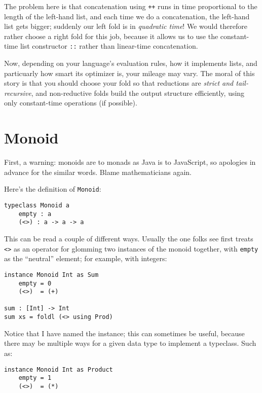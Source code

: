 \documentclass{book}
\newcommand{\mlil}[1]{\lstinline[language=pseudoml,columns=fixed]|#1|}\usepackage{caption}
\begin{document}
The problem here is that concatenation using \mlil{++} runs in time proportional to the length of the left-hand list, and each time we do a concatenation, the left-hand list gets bigger; suddenly our left fold is in \emph{quadratic time}! We would therefore rather choose a right fold for this job, because it allows us to use the constant-time list constructor \mlil{::} rather than linear-time concatenation.

Now, depending on your language's evaluation rules, how it implements lists, and particuarly how smart its optimizer is, your mileage may vary. The moral of this story is that you should choose your fold so that reductions are \emph{strict and tail-recursive}, and non-reductive folds build the output structure efficiently, using only constant-time operations (if possible).

\section{Monoid}

First, a warning: monoids are to monads as Java is to JavaScript, so apologies in advance for the similar words. Blame mathematicians again.

Here's the definition of \mlil{Monoid}:

\begin{lstlisting}[language=pseudoml]
typeclass Monoid a
    empty : a
    (<>) : a -> a -> a
\end{lstlisting}

This can be read a couple of different ways. Usually the one folks see first treats \mlil{<>} as an operator for glomming two instances of the monoid together, with \mlil{empty} as the ``neutral'' element; for example, with integers:

\begin{lstlisting}[language=pseudoml]
instance Monoid Int as Sum
    empty = 0
    (<>)  = (+)

sum : [Int] -> Int
sum xs = foldl (<> using Prod)
\end{lstlisting}

Notice that I have named the instance; this can sometimes be useful, because there may be multiple ways for a given data type to implement a typeclass. Such as:

\begin{lstlisting}[language=pseudoml]
instance Monoid Int as Product
    empty = 1
    (<>)  = (*)
\end{lstlisting}
\end{document}
